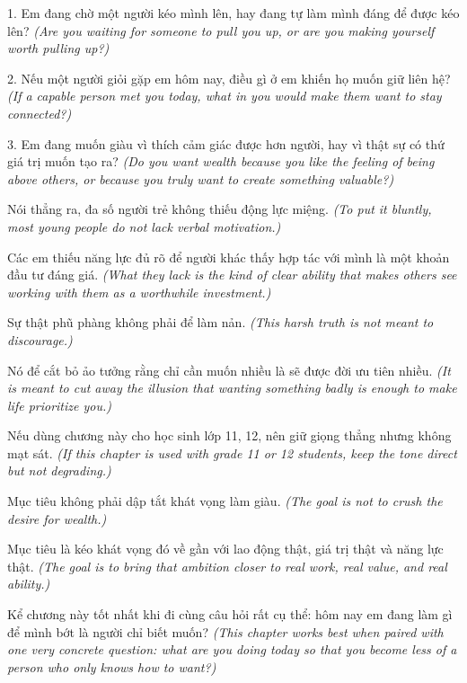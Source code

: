 \begin{tuhocnhanh}
1. Em đang chờ một người kéo mình lên, hay đang tự làm mình đáng để được kéo lên? \textit{(Are you waiting for someone to pull you up, or are you making yourself worth pulling up?)}

2. Nếu một người giỏi gặp em hôm nay, điều gì ở em khiến họ muốn giữ liên hệ? \textit{(If a capable person met you today, what in you would make them want to stay connected?)}

3. Em đang muốn giàu vì thích cảm giác được hơn người, hay vì thật sự có thứ giá trị muốn tạo ra? \textit{(Do you want wealth because you like the feeling of being above others, or because you truly want to create something valuable?)}
\end{tuhocnhanh}

\begin{tongketchuong}
Nói thẳng ra, đa số người trẻ không thiếu động lực miệng.
\textit{(To put it bluntly, most young people do not lack verbal motivation.)}

Các em thiếu năng lực đủ rõ để người khác thấy hợp tác với mình là một khoản đầu tư đáng giá.
\textit{(What they lack is the kind of clear ability that makes others see working with them as a worthwhile investment.)}

Sự thật phũ phàng không phải để làm nản.
\textit{(This harsh truth is not meant to discourage.)}

Nó để cắt bỏ ảo tưởng rằng chỉ cần muốn nhiều là sẽ được đời ưu tiên nhiều.
\textit{(It is meant to cut away the illusion that wanting something badly is enough to make life prioritize you.)}
\end{tongketchuong}

\begin{goigiaovien}
Nếu dùng chương này cho học sinh lớp 11, 12, nên giữ giọng thẳng nhưng không mạt sát.
\textit{(If this chapter is used with grade 11 or 12 students, keep the tone direct but not degrading.)}

Mục tiêu không phải dập tắt khát vọng làm giàu.
\textit{(The goal is not to crush the desire for wealth.)}

Mục tiêu là kéo khát vọng đó về gần với lao động thật, giá trị thật và năng lực thật.
\textit{(The goal is to bring that ambition closer to real work, real value, and real ability.)}

Kể chương này tốt nhất khi đi cùng câu hỏi rất cụ thể: hôm nay em đang làm gì để mình bớt là người chỉ biết muốn?
\textit{(This chapter works best when paired with one very concrete question: what are you doing today so that you become less of a person who only knows how to want?)}
\end{goigiaovien}

\ngancach